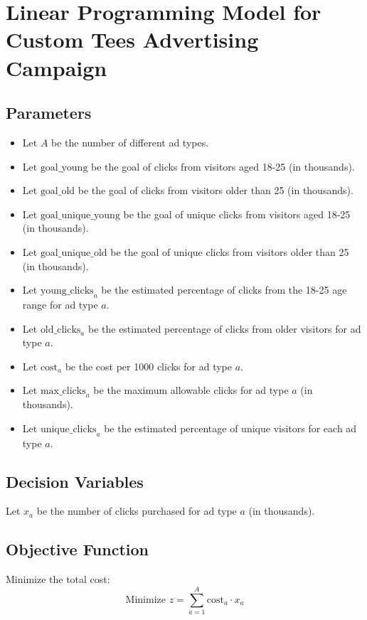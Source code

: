 \documentclass{article}
\begin{document}
\section*{Linear Programming Model for Custom Tees Advertising Campaign}

\subsection*{Parameters}
\begin{itemize}
    \item Let \( A \) be the number of different ad types.
    \item Let \( \text{goal\_young} \) be the goal of clicks from visitors aged 18-25 (in thousands).
    \item Let \( \text{goal\_old} \) be the goal of clicks from visitors older than 25 (in thousands).
    \item Let \( \text{goal\_unique\_young} \) be the goal of unique clicks from visitors aged 18-25 (in thousands).
    \item Let \( \text{goal\_unique\_old} \) be the goal of unique clicks from visitors older than 25 (in thousands).
    \item Let \( \text{young\_clicks}_a \) be the estimated percentage of clicks from the 18-25 age range for ad type \( a \).
    \item Let \( \text{old\_clicks}_a \) be the estimated percentage of clicks from older visitors for ad type \( a \).
    \item Let \( \text{cost}_a \) be the cost per 1000 clicks for ad type \( a \).
    \item Let \( \text{max\_clicks}_a \) be the maximum allowable clicks for ad type \( a \) (in thousands).
    \item Let \( \text{unique\_clicks}_a \) be the estimated percentage of unique visitors for each ad type \( a \).
\end{itemize}

\subsection*{Decision Variables}
Let \( x_a \) be the number of clicks purchased for ad type \( a \) (in thousands).

\subsection*{Objective Function}
Minimize the total cost:
\[
\text{Minimize } z = \sum_{a=1}^{A} \text{cost}_a \cdot x_a
\]
\end{document}
